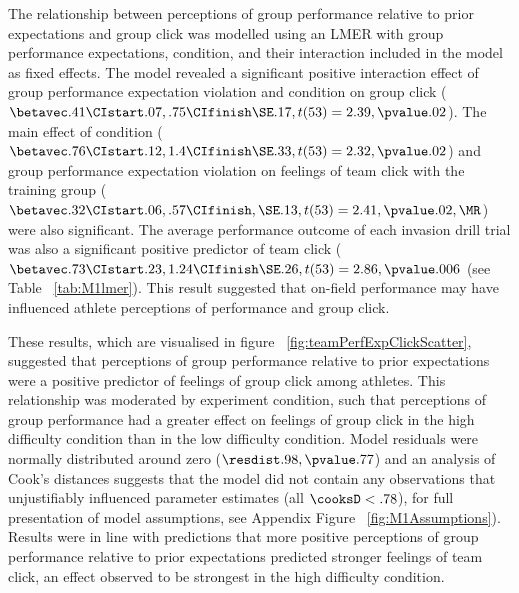 The relationship between perceptions of group performance relative to prior expectations and group click was modelled using an LMER with group performance expectations, condition, and their interaction included in the model as fixed effects. The model revealed a significant positive interaction effect of group performance expectation violation and condition on group click ($\betavec .41 \CIstart .07, .75 \CIfinish \SE .17, t(53) = 2.39, \pvalue .02 $).  The main effect of condition ($\betavec .76 \CIstart .12, 1.4 \CIfinish \SE .33, t(53) = 2.32, \pvalue .02 $) and group performance expectation violation on feelings of team click with the training group ($\betavec .32 \CIstart .06, .57 \CIfinish, \SE .13, t(53)= 2.41, \pvalue .02, \MR $) were also significant.  The average performance outcome of each invasion drill trial was also a significant positive predictor of team click ($\betavec .73 \CIstart .23, 1.24 \CIfinish \SE .26, t(53)= 2.86, \pvalue .006$ (see Table ~\ref{tab:M1lmer}). This result suggested that on-field performance may have influenced athlete perceptions of performance and group click.

These results, which are visualised in figure ~\ref{fig:teamPerfExpClickScatter}, suggested that perceptions of group performance relative to prior expectations were a positive predictor of feelings of group click among athletes.  This relationship was moderated by experiment condition, such that perceptions of group performance had a greater effect on feelings of group click in the high difficulty condition than in the low difficulty condition.  Model residuals were normally distributed around zero ($\resdist .98, \pvalue .77 $) and an analysis of Cook's distances suggests that the model did not contain any observations that unjustifiably influenced parameter estimates (all $\cooksD < .78$), for full presentation of model assumptions, see Appendix Figure ~\ref{fig:M1Assumptions}).  Results were in line with predictions that more positive perceptions of group performance relative to prior expectations predicted stronger feelings of team click, an effect observed to be strongest in the high difficulty condition.




